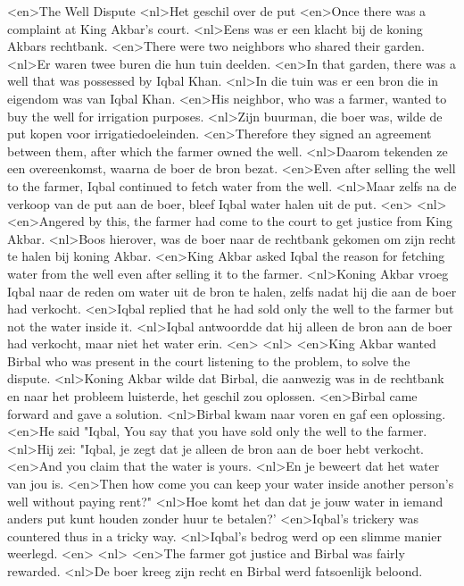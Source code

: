 <en>The Well Dispute
<nl>Het geschil over de put
<en>Once there was a complaint at King Akbar's court.
<nl>Eens was er een klacht bij de koning Akbars rechtbank.
<en>There were two neighbors who shared their garden.
<nl>Er waren twee buren die hun tuin deelden.
<en>In that garden, there was a well that was possessed by Iqbal Khan.
<nl>In die tuin was er een bron die in eigendom was van Iqbal Khan.
<en>His neighbor, who was a farmer, wanted to buy the well for irrigation purposes.
<nl>Zijn buurman, die boer was, wilde de put kopen voor irrigatiedoeleinden.
<en>Therefore they signed an agreement between them, after which the farmer owned the well.
<nl>Daarom tekenden ze een overeenkomst, waarna de boer de bron bezat.
<en>Even after selling the well to the farmer, Iqbal continued to fetch water from the well.
<nl>Maar zelfs na de verkoop van de put aan de boer, bleef Iqbal water halen uit de put.
<en>
<nl>
<en>Angered by this, the farmer had come to the court to get justice from King Akbar.
<nl>Boos hierover, was de boer naar de rechtbank gekomen om zijn recht te halen bij  koning Akbar.
<en>King Akbar asked Iqbal the reason for fetching water from the well even after selling it to the farmer.
<nl>Koning Akbar vroeg Iqbal naar de reden om water uit de bron te halen, zelfs nadat hij die aan de boer had verkocht.
<en>Iqbal replied that he had sold only the well to the farmer but not the water inside it.
<nl>Iqbal antwoordde dat hij alleen de bron aan de boer had verkocht, maar niet het water erin.
<en>
<nl>
<en>King Akbar wanted Birbal who was present in the court listening to the problem, to solve the dispute.
<nl>Koning Akbar wilde dat Birbal, die aanwezig was in de rechtbank en naar het probleem luisterde, het geschil zou oplossen.
<en>Birbal came forward and gave a solution.
<nl>Birbal kwam naar voren en gaf een oplossing.
<en>He said "Iqbal, You say that you have sold only the well to the farmer.
<nl>Hij zei: "Iqbal, je zegt dat je alleen de bron aan de boer hebt verkocht.
<en>And you claim that the water is yours.
<nl>En je beweert dat het water van jou is.
<en>Then how come you can keep your water inside another person's well without paying rent?"
<nl>Hoe komt het dan dat je jouw water in iemand anders put kunt houden zonder huur te betalen?'
<en>Iqbal's trickery was countered thus in a tricky way.
<nl>Iqbal's bedrog werd op een slimme manier weerlegd.
<en>
<nl>
<en>The farmer got justice and Birbal was fairly rewarded.
<nl>De boer kreeg zijn recht en Birbal werd fatsoenlijk beloond.
